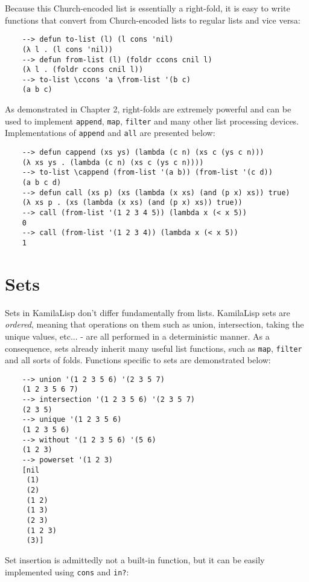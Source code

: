 Because this Church-encoded list is essentially a right-fold, it is easy to write functions that convert from Church-encoded lists to regular lists and vice versa:

\begin{Verbatim}
    --> defun to-list (l) (l cons 'nil)
    (λ l . (l cons 'nil))
    --> defun from-list (l) (foldr ccons cnil l)
    (λ l . (foldr ccons cnil l))
    --> to-list \ccons 'a \from-list '(b c)
    (a b c)
\end{Verbatim}

As demonstrated in Chapter 2, right-folds are extremely powerful and can be used to implement \verb|append|, \verb|map|, \verb|filter| and many other list processing devices. Implementations of \verb|append| and \verb|all| are presented below:

\begin{Verbatim}
    --> defun cappend (xs ys) (lambda (c n) (xs c (ys c n)))
    (λ xs ys . (lambda (c n) (xs c (ys c n))))
    --> to-list \cappend (from-list '(a b)) (from-list '(c d))
    (a b c d)
    --> defun call (xs p) (xs (lambda (x xs) (and (p x) xs)) true)
    (λ xs p . (xs (lambda (x xs) (and (p x) xs)) true))
    --> call (from-list '(1 2 3 4 5)) (lambda x (< x 5))
    0
    --> call (from-list '(1 2 3 4)) (lambda x (< x 5))
    1
\end{Verbatim}

\section{Sets}

Sets in KamilaLisp don't differ fundamentally from lists. KamilaLisp sets are \textit{ordered}, meaning that operations on them such as union, intersection, taking the unique values, etc... - are all performed in a deterministic manner. As a consequence, sets already inherit many useful list functions, such as \verb|map|, \verb|filter| and all sorts of folds. Functions specific to sets are demonstrated below:

\begin{Verbatim}
    --> union '(1 2 3 5 6) '(2 3 5 7)
    (1 2 3 5 6 7)
    --> intersection '(1 2 3 5 6) '(2 3 5 7)
    (2 3 5)
    --> unique '(1 2 3 5 6)
    (1 2 3 5 6)
    --> without '(1 2 3 5 6) '(5 6)
    (1 2 3)
    --> powerset '(1 2 3)
    [nil
     (1)
     (2)
     (1 2)
     (1 3)
     (2 3)
     (1 2 3)
     (3)]
\end{Verbatim}

Set insertion is admittedly not a built-in function, but it can be easily implemented using \verb|cons| and \verb|in?|:

